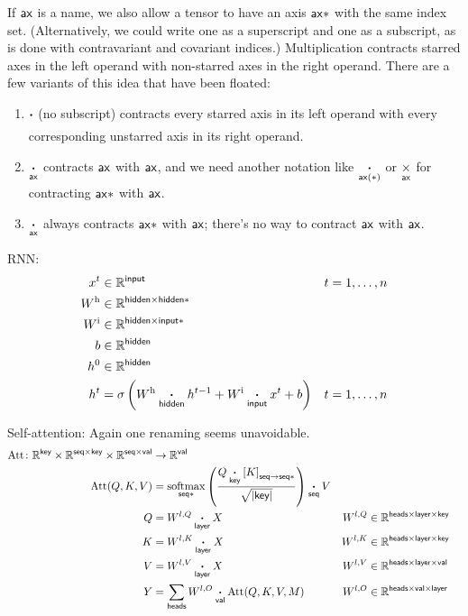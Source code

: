 If $\name{ax}$ is a name, we also allow a tensor to have an axis $\name{ax*}$ with the same index set. (Alternatively, we could write one as a superscript and one as a subscript, as is done with contravariant and covariant indices.) Multiplication contracts starred axes in the left operand with non-starred axes in the right operand.
There are a few variants of this idea that have been floated:
\begin{enumerate}
\item $\ndot{}$ (no subscript) contracts every starred axis in its left operand with every corresponding unstarred axis in its right operand.
\item $\ndot{ax}$ contracts $\name{ax}$ with $\name{ax}$, and we need another notation like $\ndot{ax(*)}$ or $\nbin{ax}{\times}$ for contracting $\name{ax*}$ with $\name{ax}$.
\item $\ndot{ax}$ always contracts $\name{ax*}$ with $\name{ax}$; there's no way to contract $\name{ax}$ with $\name{ax}$.
\end{enumerate}

RNN:
\begin{align*}
x^{t} &\in \mathbb{R}^{\name{input}} & t &= 1, \ldots, n \\
W^{\text{h}} &\in \mathbb{R}^{\name{hidden} \times \name{hidden*}} \\
W^{\text{i}} &\in \mathbb{R}^{\name{hidden} \times \name{input*}} \\
b &\in \mathbb{R}^{\name{hidden}} \\
h^{0} &\in \mathbb{R}^{\name{hidden}} \\
h^{t} &= \sigma\left( W^{\text{h}} \ndot{hidden} h^{t-1} + W^{\text{i}} \ndot{input} x^{t} + b \right) & t &= 1, \ldots, n
\end{align*}

Self-attention: Again one renaming seems unavoidable.
\begin{align*}
  \text{Att} \colon \mathbb{R}^{\name{key}} \times \mathbb{R}^{\name{seq} \times\name{key}} \times \mathbb{R}^{\name{seq} \times\name{val}} &\rightarrow \mathbb{R}^{\name{val}} \\
  \text{Att}(Q,K,V) &= \nfun{seq*}{softmax} \left( \frac{Q \ndot{key} \nmov{seq}{seq*}{K}}{\sqrt{|\name{key}|}} \right) \ndot{seq} V \\
  Q &= W^{l,Q} \ndot{layer} X & W^{l,Q} &\in \mathbb{R}^{\name{heads} \times \name{layer} \times \name{key}} \\
  K &= W^{l,K} \ndot{layer} X & W^{l,K} &\in \mathbb{R}^{\name{heads} \times \name{layer} \times \name{key}} \\
  V &= W^{l,V} \ndot{layer} X & W^{l,V} &\in \mathbb{R}^{\name{heads} \times \name{layer} \times \name{val}} \\
  Y &= \nsum{heads} W^{l,O} \ndot{val} \text{Att}(Q, K, V, M) & W^{l,O} &\in \mathbb{R}^{\name{heads} \times \name{val} \times \name{layer}}
\end{align*}

